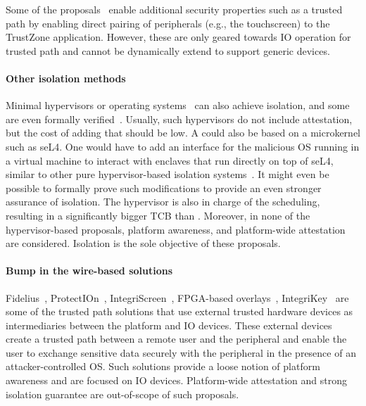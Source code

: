 Some of the proposals~\cite{TruZ-Droid,trustUI,SeCloak,VButton} enable additional security properties such as a trusted path by enabling direct pairing of peripherals (e.g., the touchscreen) to the TrustZone application. However, these are only geared towards IO operation for trusted path and cannot be dynamically extend to support generic devices.

\paragraph{Other isolation methods} Minimal hypervisors or operating systems~\cite{herder2006minix,klein2009sel4} can also achieve isolation, and some are even formally verified~\cite{klein2009sel4}. Usually, such hypervisors do not include attestation, but the cost of adding that should be low. A \name{} could also be based on a microkernel such as seL4. One would have to add an interface for the malicious OS running in a virtual machine to interact with enclaves that run directly on top of seL4, similar to other pure hypervisor-based isolation systems~\cite{virtualGhost,Overshadow,InkTag,TrustVisor,SplittingInterfaces,terra}. It might even be possible to formally prove such modifications to provide an even stronger assurance of isolation. 
The hypervisor is also in charge of the scheduling, resulting in a significantly bigger TCB than \name. Moreover, in none of the hypervisor-based proposals, platform awareness, and platform-wide attestation are considered. Isolation is the sole objective of these proposals.

\paragraph{Bump in the wire-based solutions} Fidelius~\cite{Fidelius}, ProtectIOn~\cite{protection}, IntegriScreen~\cite{integriscreen}, FPGA-based overlays~\cite{fpga_overlay}, IntegriKey~\cite{integrikey} are some of the trusted path solutions that use external trusted hardware devices as intermediaries between the platform and IO devices. These external devices create a trusted path between a remote user and the peripheral and enable the user to exchange sensitive data securely with the peripheral in the presence of an attacker-controlled OS. Such solutions provide a loose notion of platform awareness and are focused on IO devices. Platform-wide attestation and strong isolation guarantee are out-of-scope of such proposals. 

